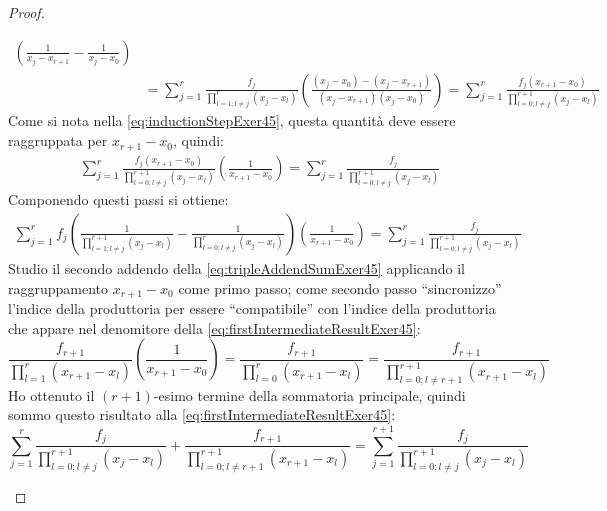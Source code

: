 \begin{proof}
\begin{enumerate}
\begin{itemize}
\begin{displaymath}
\begin{split}
{  		\left (
  		\frac{1}{x_{j} - x_{r+1}} -
  		\frac{1}{x_{j} - x_{0}}
  		\right)} \\
  		&= \sum_{j = 1}^{r}{
  		\frac{f_{j}}{\prod_{l = 1;l \not = j}^{r}{(x_{j} - x_{l})}} 
  		\left (
  		\frac{(x_{j} - x_{0})-(x_{j} - x_{r+1})}{(x_{j} - x_{r+1})(x_{j} - x_{0})}
  		\right)} = 
  		\sum_{j = 1}^{r}{
  		\frac{f_{j}(x_{r+1} - x_{0})}{\prod_{l = 0;l \not = j}^{r+1}{(x_{j} -
  		x_{l})}}}
  	\end{split}
  	\end{displaymath}
  	Come si nota nella \ref{eq:inductionStepExer45}, 
  	questa quantit\`a deve essere raggruppata per $x_{r+1} - x_{0}$, quindi:
  	\begin{displaymath}
  	\begin{split} 
  		\sum_{j = 1}^{r}{
  		\frac{f_{j}(x_{r+1} - x_{0})}{\prod_{l = 0;l \not = j}^{r+1}{(x_{j} -
  		x_{l})}}} \left(\frac{1}{x_{r+1} - x_{0}}\right ) = 
  		\sum_{j = 1}^{r}{
  		\frac{f_{j}}{\prod_{l = 0;l \not = j}^{r+1}{(x_{j} -
  		x_{l})}}}
  	\end{split}
  	\end{displaymath}
  	Componendo questi passi si ottiene:
  	\begin{equation}
  	\label{eq:firstIntermediateResultExer45}
  	\begin{split} 
  		\sum_{j = 1}^{r}{
  		f_{j} \left ( \frac{1}{\prod_{l = 1;l \not = j}^{r+1}{(x_{j} - x_{l})}} -
  		\frac{1}{\prod_{l = 0;l \not = j}^{r}{(x_{j} - x_{l})}}
  		\right)} \left(\frac{1}{x_{r+1} - x_{0}}\right) = 
  		\sum_{j = 1}^{r}{
  		\frac{f_{j}}{\prod_{l = 0;l \not = j}^{r+1}{(x_{j} -
  		x_{l})}}}
  	\end{split}
  	\end{equation}
  	Studio il secondo addendo della \ref{eq:tripleAddendSumExer45} applicando il
  	raggruppamento $x_{r+1} - x_{0}$ come primo passo; come secondo passo
  	``sincronizzo'' l'indice della produttoria per essere ``compatibile'' 
  	con l'indice della produttoria che appare nel denomitore della
  	\ref{eq:firstIntermediateResultExer45}:
  	\begin{displaymath}
  	\frac{f_{r+1}}{\prod_{l = 1}^{r}{(x_{r+1} - x_{l})}}  \left(\frac{1}{x_{r+1}
  	- x_{0}}\right) = \frac{f_{r+1}}{\prod_{l = 0}^{r}{(x_{r+1} - x_{l})}} = 
  	\frac{f_{r+1}}{\prod_{l = 0;l \not = r+1}^{r+1}{(x_{r+1} - x_{l})}}
  	\end{displaymath}
  	Ho ottenuto il $(r+1)$-esimo termine della sommatoria principale, quindi
  	sommo questo risultato alla \ref{eq:firstIntermediateResultExer45}:
  	\begin{equation}
  	\label{eq:secondIntermediateResultExer45}
  	\sum_{j = 1}^{r}{
  		\frac{f_{j}}{\prod_{l = 0;l \not = j}^{r+1}{(x_{j} -
  		x_{l})}}} + 
  	\frac{f_{r+1}}{\prod_{l = 0;l \not = r+1}^{r+1}{(x_{r+1} - x_{l})}} =
  	\sum_{j = 1}^{r+1}{
  		\frac{f_{j}}{\prod_{l = 0;l \not = j}^{r+1}{(x_{j} -
  		x_{l})}}} 
  	\end{equation}
  	

\end{itemize}
\end{enumerate}
\end{proof}
